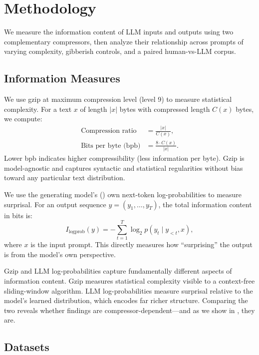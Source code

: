 \section{Methodology}
\label{sec:method}

We measure the information content of LLM inputs and outputs using two complementary compressors, then analyze their relationship across prompts of varying complexity, gibberish controls, and a paired human-vs-LLM corpus.

\subsection{Information Measures}
\label{sec:measures}

We use gzip at maximum compression level (level 9) to measure statistical complexity. For a text $x$ of length $|x|$ bytes with compressed length $C(x)$ bytes, we compute:
\begin{align}
    \text{Compression ratio} &= \frac{|x|}{C(x)}, \label{eq:ratio} \\
    \text{Bits per byte (bpb)} &= \frac{8 \cdot C(x)}{|x|}. \label{eq:bpb}
\end{align}
Lower bpb indicates higher compressibility (\ie less information per byte). Gzip is model-agnostic and captures syntactic and statistical regularities without bias toward any particular text distribution.

We use the generating model's (\gptmini) own next-token log-probabilities to measure surprisal. For an output sequence $y = (y_1, \ldots, y_T)$, the total information content in bits is:
\begin{equation}
    I_{\text{logprob}}(y) = -\sum_{t=1}^{T} \log_2 p(y_t \mid y_{<t}, x), \label{eq:logprob}
\end{equation}
where $x$ is the input prompt. This directly measures how ``surprising'' the output is from the model's own perspective.

Gzip and LLM log-probabilities capture fundamentally different aspects of information content. Gzip measures statistical complexity visible to a context-free sliding-window algorithm. LLM log-probabilities measure surprisal relative to the model's learned distribution, which encodes far richer structure. Comparing the two reveals whether findings are compressor-dependent---and as we show in , they are.

\subsection{Datasets}
\label{sec:datasets}

